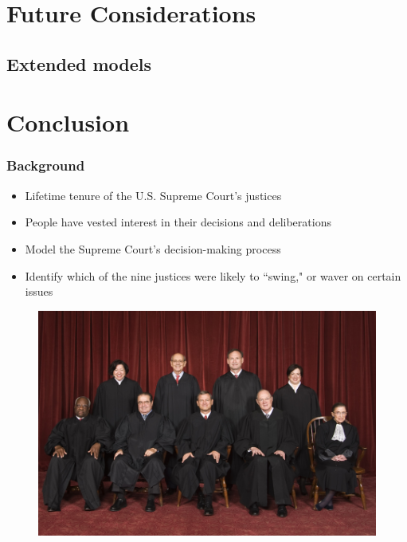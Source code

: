 \documentclass{beamer}
\begin{document}
\section{Future Considerations}
\subsection{Extended models}

\section{Conclusion}


\begin{frame}
\frametitle{Background}
\begin{itemize}
	 \item Lifetime tenure of the U.S. Supreme Court's justices
	 \item People have vested interest in their decisions and deliberations
	 \item Model the Supreme Court's decision-making process
	 \item Identify which of the nine justices were likely to ``swing," or waver on certain issues
\end{itemize}

\begin{figure}[h]
\begin{center}
\includegraphics[width=0.6\columnwidth]{roberts6}
\end{center}
\end{figure}


\end{frame}

\end{document}

